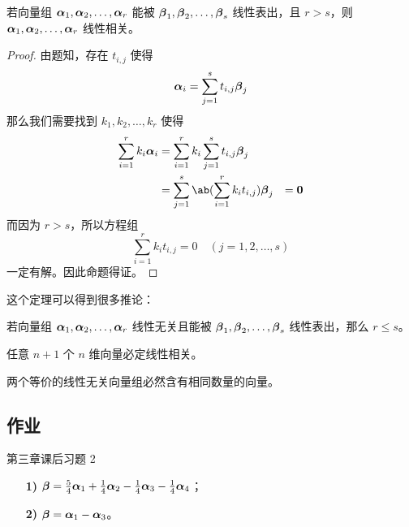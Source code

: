 \begin{theorem} \label{theorem:线性表出与向量组大小关系}
	若向量组 $\boldsymbol{\alpha}_1, \boldsymbol{\alpha}_2, \dots, \boldsymbol{\alpha}_r$ 能被 $\boldsymbol{\beta}_1, \boldsymbol{\beta}_2, \dots, \boldsymbol{\beta}_s$ 线性表出，且 $r>s$，则 $\boldsymbol{\alpha}_1, \boldsymbol{\alpha}_2, \dots, \boldsymbol{\alpha}_r$ 线性相关。

	\begin{proof}
		由题知，存在 $t_{i,j}$ 使得
		$$
		\boldsymbol{\alpha}_i = \sum_{j=1}^s t_{i,j} \boldsymbol{\beta}_j
		$$
		那么我们需要找到 $k_1, k_2, \dots, k_r$ 使得
		$$
		\begin{aligned}
			\sum_{i=1}^r k_i\vect{\alpha}_i
			& = \sum_{i=1}^r k_i \sum_{j=1}^s t_{i,j} \vect{\beta}_j \\
			& = \sum_{j=1}^s \ab(\sum_{i=1}^r k_i t_{i,j}) \vect{\beta}_j & = \vect{0} \\
		\end{aligned}
		$$
		而因为 $r>s$，所以方程组
		$$
		\sum_{i=1}^r k_i t_{i,j} = 0 \quad (j=1,2,\dots,s)
		$$
		一定有解。因此命题得证。
	\end{proof}
\end{theorem}

这个定理可以得到很多推论：

\begin{corollary}
	若向量组 $\boldsymbol{\alpha}_1, \boldsymbol{\alpha}_2, \dots, \boldsymbol{\alpha}_r$ 线性无关且能被 $\boldsymbol{\beta}_1, \boldsymbol{\beta}_2, \dots, \boldsymbol{\beta}_s$ 线性表出，那么 $r \le s$。
\end{corollary}

\begin{corollary}
	任意 $n+1$ 个 $n$ 维向量必定线性相关。
\end{corollary}

\begin{corollary}
	两个等价的线性无关向量组必然含有相同数量的向量。
\end{corollary}

\subsection{作业}

\begin{problem}
	第三章课后习题 2
	\begin{solution}
		\begin{enumerate}
			\item[\textbf{1)}] $\boldsymbol{\beta} = \frac{5}{4}\boldsymbol{\alpha}_1 + \frac{1}{4}\boldsymbol{\alpha}_2 - \frac{1}{4}\boldsymbol{\alpha}_3 - \frac{1}{4}\boldsymbol{\alpha}_4$；
			\item[\textbf{2)}] $\boldsymbol{\beta} = \boldsymbol{\alpha}_1 - \boldsymbol{\alpha}_3$。
		\end{enumerate}
	\end{solution}
\end{problem}

